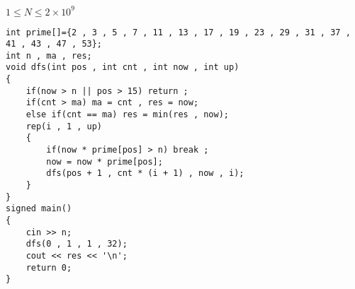 \documentclass[E:/GsjzTle/main/main.tex]{subfiles}
\begin{document}
\(1 \leq N \leq 2 \times 10^9\)

\begin{lstlisting}
int prime[]={2 , 3 , 5 , 7 , 11 , 13 , 17 , 19 , 23 , 29 , 31 , 37 , 41 , 43 , 47 , 53};
int n , ma , res;
void dfs(int pos , int cnt , int now , int up)
{
	if(now > n || pos > 15) return ;
	if(cnt > ma) ma = cnt , res = now;
	else if(cnt == ma) res = min(res , now);
	rep(i , 1 , up)
	{
		if(now * prime[pos] > n) break ;
		now = now * prime[pos];
		dfs(pos + 1 , cnt * (i + 1) , now , i);
	}
}
signed main()
{
	cin >> n;
	dfs(0 , 1 , 1 , 32);
	cout << res << '\n';
	return 0;
}
\end{lstlisting}
\end{document}
